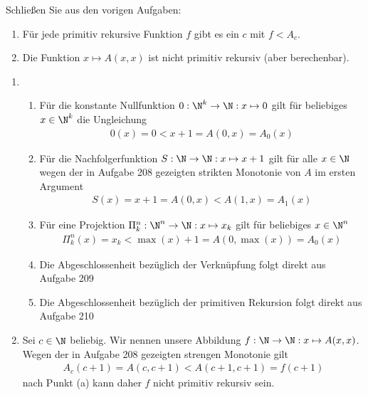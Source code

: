 
\begin{exercise}[211]

Schließen Sie aus den vorigen Aufgaben:
\begin{enumerate}[label = \alph*.]
  \item Für jede primitiv rekursive Funktion $f$ gibt es ein $c$ mit $f < A_c$.
  \item Die Funktion $x \mapsto A(x,x)$ ist nicht primitiv rekursiv (aber berechenbar).
\end{enumerate}

\end{exercise}


\begin{solution}
	\phantom{}
	\begin{enumerate}[label = \alph*.]
		\item
			\begin{enumerate}[label = \arabic*.]
				\item Für die konstante Nullfunktion $0: \N^k \to \N: x \mapsto 0$ gilt für beliebiges $x \in \N^k$ die Ungleichung 
					\begin{align*}
					0(x) = 0 < x + 1 = A(0, x) = A_0(x)
					\end{align*}
				
				\item Für die Nachfolgerfunktion $S: \N \to \N: x \mapsto x + 1$ gilt für alle $x \in \N$ wegen der in Aufgabe 208 gezeigten strikten Monotonie von $A$ im ersten Argument
					\begin{align*}
					S(x) = x + 1 = A(0, x) < A(1, x) = A_1(x)
					\end{align*} 
				
				\item Für eine Projektion $\Pi_k^n: \N^n \to \N: x \mapsto x_k$ gilt für beliebiges $x \in \N^n$
				\begin{align*}
				\Pi_k^n(x) = x_k < \max(x) + 1 = A(0, \max(x)) = A_0(x)
				\end{align*}
				
				\item Die Abgeschlossenheit bezüglich der Verknüpfung folgt direkt aus Aufgabe 209
				
				\item Die Abgeschlossenheit bezüglich der primitiven Rekursion folgt direkt aus Aufgabe 210
			\end{enumerate} 
		\item Sei $c \in \N$ beliebig. Wir nennen unsere Abbildung $f: \N \to \N: x \mapsto A(x,x)$. Wegen der in Aufgabe 208 gezeigten strengen Monotonie gilt 
		\begin{align*}
		A_c(c + 1) = A(c, c + 1) < A(c + 1, c + 1) = f(c + 1)
		\end{align*}
		nach Punkt (a) kann daher $f$ nicht primitiv rekursiv sein.
	\end{enumerate}
	
\end{solution}
